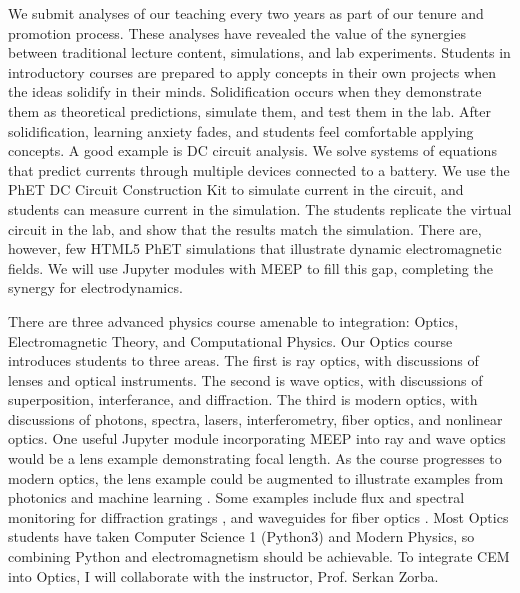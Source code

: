 \documentclass[10pt]{amsart}
\theoremstyle{definition}
\numberwithin{equation}{section}
\begin{document}
We submit analyses of our teaching every two years as part of our tenure and promotion process.  These analyses have revealed the value of the synergies between traditional lecture content, simulations, and lab experiments.  Students in introductory courses are prepared to apply concepts in their own projects when the ideas solidify in their minds.  Solidification occurs when they demonstrate them as theoretical predictions, simulate them, and test them in the lab.  After solidification, learning anxiety fades, and students feel comfortable applying concepts.  A good example is DC circuit analysis.  We solve systems of equations that predict currents through multiple devices connected to a battery.  We use the PhET DC Circuit Construction Kit to simulate current in the circuit, and students can measure current in the simulation.  The students replicate the virtual circuit in the lab, and show that the results match the simulation.  There are, however, few HTML5 PhET simulations that illustrate dynamic electromagnetic fields.  We will use Jupyter modules with MEEP to fill this gap, completing the synergy for electrodynamics. 

There are three advanced physics course amenable to integration: Optics, Electromagnetic Theory, and Computational Physics.  Our Optics course introduces students to three areas.  The first is ray optics, with discussions of lenses and optical instruments.  The second is wave optics, with discussions of superposition, interferance, and diffraction. The third is modern optics, with discussions of photons, spectra, lasers, interferometry, fiber optics, and nonlinear optics.  One useful Jupyter module incorporating MEEP into ray and wave optics would be a lens example demonstrating focal length.  As the course progresses to modern optics, the lens example could be augmented to illustrate examples from photonics and machine learning \cite{meepcon2022_3}.  Some examples include flux and spectral monitoring for diffraction gratings \cite{meepcon2022_4}, and waveguides for fiber optics \cite{meepcon2022_5}.  Most Optics students have taken Computer Science 1 (Python3) and Modern Physics, so combining Python and electromagnetism should be achievable.  To integrate CEM into Optics, I will collaborate with the instructor, Prof. Serkan Zorba.  
\end{document}
